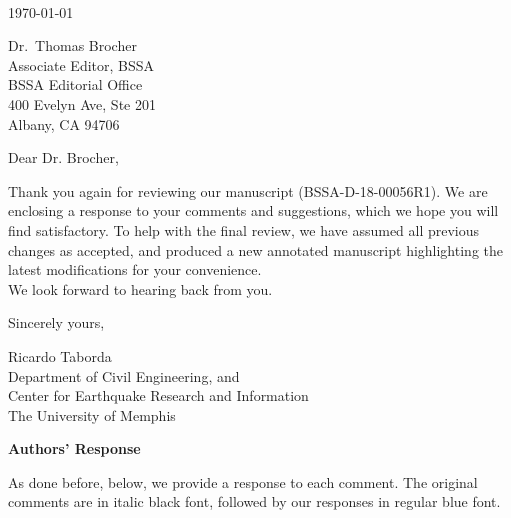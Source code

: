 \documentclass{article}
\begin{document}

\thispagestyle{empty}
\setcounter{page}{0}

~

\vspace{6em}
\noindent\today

\vspace{5em}
\noindent
Dr.~Thomas Brocher\\
Associate Editor, BSSA\\
BSSA Editorial Office\\
400 Evelyn Ave, Ste 201\\
Albany, CA 94706

\vspace{4em}
\noindent
Dear Dr. Brocher,

\vspace{1em}
\noindent
Thank you again for reviewing our manuscript (BSSA-D-18-00056R1). We are enclosing a response to your comments and suggestions, which we hope you will find satisfactory. To help with the final review, we have assumed all previous changes as accepted, and produced a new annotated manuscript highlighting the latest modifications for your convenience.
\\

\noindent
We look forward to hearing back from you.

\vspace{2em}
\noindent
Sincerely yours,


\vspace{5em}
\noindent
Ricardo Taborda\\
Department of Civil Engineering, and\\
Center for Earthquake Research and Information\\
The University of Memphis

\newpage
\begin{center}
	\bf
	\large
	Authors' Response
\end{center}

\noindent
As done before, below, we provide a response to each comment. The original comments are in italic black font, followed by our responses in regular blue font.
\vspace{2ex}
\newline

\end{document}

